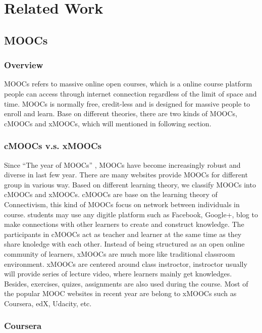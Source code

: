 \chapter{Related Work}

\section{MOOCs}

\subsection{Overview}
MOOCs refers to massive online open courses, which is a online course platform people can access through internet connection regardless of the limit of space and time.
MOOCs is normally free, credit-less and is designed for massive people to enroll and learn.
Base on different theories, there are two kinds of MOOCs, cMOOCs and xMOOCs, which will mentioned in following section.

\subsection{cMOOCs v.s. xMOOCs}
Since ``The year of MOOCs'' \cite{pappano2012}, MOOCs have become increasingly robust and diverse in last few year.
There are many websites provide MOOCs for different group in various way.
Based on different learning theory, we classify MOOCs into cMOOCs and xMOOCs.
cMOOCs are base on the learning theory of Connectivism, this kind of MOOCs focus on network between individuals in course.
students may use any digitle platform such as Facebook, Google+, blog to make connections with other learners to create and construct knowledge.
The participants in cMOOCs act as teacher and learner at the same time as they share knoledge with each other.
Instead of being structured as an open online community of learners, xMOOCs are much more like traditional classroom environment.
xMOOCs are centered around class instroctor, instroctor usually will provide series of lecture video, where learners mainly get knowledges.
Besides, exercises, quizes, assignments are also used during the course.
Most of the popular MOOC websites in recent year are belong to xMOOCs such as Coursera, edX, Udacity, etc.

\subsection{Coursera}

